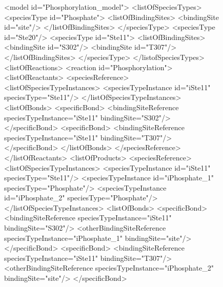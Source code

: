 \documentclass{cekarticle}
\begin{document}
\begin{figure}[h]
\begin{example}
<model id="Phosphorylation_model">
    <listOfSpeciesTypes>
        <speciesType id="Phosphate">
            <listOfBindingSites>
                <bindingSite id="site"/>
            </listOfBindingSites>
        </speciesType>
        <speciesType id="Ste20"/>
        <speciesType id="Ste11">
            <listOfBindingSites>
                <bindingSite id="S302"/>
                <bindingSite id="T307"/>
            </listOfBindingSites>
        </speciesType>
    </listofSpeciesTypes>
    <listOfReactions>
        <reaction id="Phosphorylation">
            <listOfReactants>
                <speciesReference>
                    <listOfSpeciesTypeInstances>
                        <speciesTypeInstance id="iSte11" speciesType="Ste11"/>
                    </listOfSpeciesTypeInstances>
                    <listOfBonds>
                        <specificBond>
                            <bindingSiteReference
                                speciesTypeInstance="iSte11" bindingSite="S302"/>
                        </specificBond>
                        <specificBond>
                            <bindingSiteReference
                                speciesTypeInstance="iSte11" bindingSite="T307"/>
                        </specificBond>
                    </listOfBonds>
                </speciesReference>
            </listOfReactants>
            <listOfProducts>
                <speciesReference>
                    <listOfSpeciesTypeInstances>
                        <speciesTypeInstance id="iSte11" speciesType="Ste11"/>
                        <speciesTypeInstance id="iPhosphate_1" speciesType="Phosphate"/>
                        <speciesTypeInstance id="iPhosphate_2" speciesType="Phosphate"/>
                    </listOfSpeciesTypeInstances>
                    <listOfBonds>
                        <specificBond>
                            <bindingSiteReference speciesTypeInstance="iSte11"
                                bindingSite="S302"/>
                            <otherBindingSiteReference
                                speciesTypeInstance="iPhosphate_1" bindingSite="site"/>
                        </specificBond>
                        <specificBond>
                            <bindingSiteReference
                                speciesTypeInstance="iSte11" bindingSite="T307"/>
                            <otherBindingSiteReference
                                speciesTypeInstance="iPhosphate_2" bindingSite="site"/>
                        </specificBond>

\end{example}
\end{figure}
\end{document}
